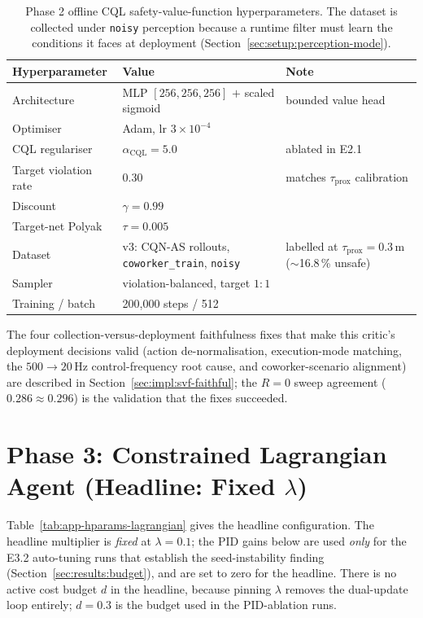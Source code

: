 \documentclass[11pt,a4paper]{report}
\newcommand{\cqnas}{CQN-AS}
\begin{document}
\begin{table}[h]
\centering
\small
\caption{Phase 2 offline CQL safety-value-function hyperparameters.
The dataset is collected under \texttt{noisy} perception because a
runtime filter must learn the conditions it faces at deployment
(Section~\ref{sec:setup:perception-mode}).}
\label{tab:app-hparams-svf}
\begin{tabular}{lll}
\toprule
Hyperparameter & Value & Note \\
\midrule
Architecture & MLP $[256, 256, 256]$ $+$ scaled sigmoid & bounded value head \\
Optimiser & Adam, lr $3\times 10^{-4}$ & \\
CQL regulariser & $\alpha_{\mathrm{CQL}} = 5.0$ & ablated in E2.1 \\
Target violation rate & $0.30$ & matches $\tau_{\mathrm{prox}}$ calibration \\
Discount & $\gamma = 0.99$ & \\
Target-net Polyak & $\tau = 0.005$ & \\
Dataset & v3: \cqnas{} rollouts, \texttt{coworker\_train}, \texttt{noisy} & labelled at $\tau_{\mathrm{prox}}{=}0.3$\,m ($\sim$16.8\,\% unsafe) \\
Sampler & violation-balanced, target $1{:}1$ & \\
Training / batch & 200{,}000 steps / 512 & \\
\bottomrule
\end{tabular}
\end{table}

The four collection-versus-deployment faithfulness fixes that make
this critic's deployment decisions valid (action de-normalisation,
execution-mode matching, the $500 \rightarrow 20$\,Hz control-frequency
root cause, and coworker-scenario alignment) are described in
Section~\ref{sec:impl:svf-faithful}; the $R = 0$ sweep agreement
($0.286 \approx 0.296$) is the validation that the fixes succeeded.

\section{Phase 3: Constrained Lagrangian Agent (Headline: Fixed $\lambda$)}
\label{app:hparams:lagrangian}

Table~\ref{tab:app-hparams-lagrangian} gives the headline
configuration. The headline multiplier is \emph{fixed} at
$\lambda = 0.1$; the PID gains below are used \emph{only} for the
E3.2 auto-tuning runs that establish the seed-instability finding
(Section~\ref{sec:results:budget}), and are set to zero for the
headline. There is no active cost budget $d$ in the headline, because
pinning $\lambda$ removes the dual-update loop entirely; $d = 0.3$ is
the budget used in the PID-ablation runs.
\end{document}
